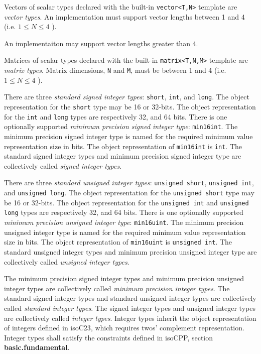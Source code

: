\p Vectors of scalar types declared with the built-in \texttt{vector<T,N>}
template are \textit{vector types}. An implementation must support vector
lengths between 1 and 4 (i.e. \( 1 \leq N \leq 4 \) ).

\begin{note}
  An implementaiton may support vector lengths greater than 4.
\end{note}

\p Matrices of scalar types declared with the built-in \texttt{matrix<T,N,M>}
template are \textit{matrix types}. Matrix dimensions, \texttt{N} and
\texttt{M}, must be between 1 and 4 (i.e. \( 1 \leq N \leq 4 \) ).


\p There are three \textit{standard signed integer types}: \texttt{short},
\texttt{int}, and \texttt{long}. The object representation for the
\texttt{short} type may be 16 or 32-bits. The object representation for the
\texttt{int} and \texttt{long} types are respectively 32, and 64 bits. There is
one optionally supported \textit{minimum precision signed integer type}:
\texttt{min16int}. The minimum precision signed integer type is named for the
required minimum value representation size in bits. The object representation of
\texttt{min16int} is \texttt{int}. The standard signed integer types and minimum
precision signed integer type are collectively called \textit{signed integer
types}.

\p There are three \textit{standard unsigned integer types}: \texttt{unsigned
short}, \texttt{unsigned int}, and \texttt{unsigned long}. The object
representation for the \texttt{unsigned short} type may be 16 or 32-bits. The
object representation for the \texttt{unsigned int} and \texttt{unsigned long}
types are respectively 32, and 64 bits. There is one optionally supported
\textit{minimum precision unsigned integer type}: \texttt{min16uint}. The
minimum precision unsigned integer type is named for the required minimum value
representation size in bits. The object representation of \texttt{min16uint} is
\texttt{unsigned int}. The standard unsigned integer types and minimum precision
unsigned integer type are collectively called \textit{unsigned integer types}.

\p The minimum precision signed integer types and minimum precision unsigned
integer types are collectively called \textit{minimum precision integer types}.
The standard signed integer types and standard unsigned integer types are
collectively called \textit{standard integer types}. The signed integer types
and unsigned integer types are collectively called \textit{integer types}.
Integer types inherit the object representation of integers defined in
\glsdesc{isoC23}, which requires twos' complement representation. Integer types
shall satisfy the constraints defined in \glsdesc{isoCPP}, section
\textbf{basic.fundamental}.

